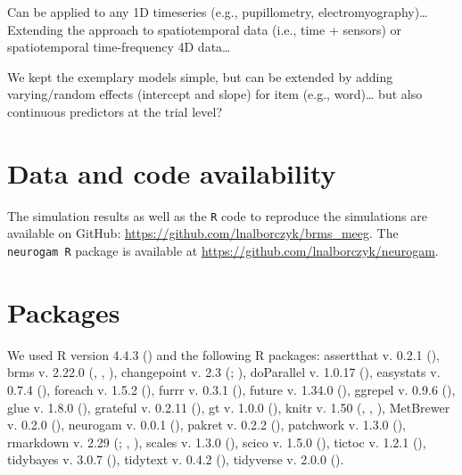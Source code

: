 \documentclass[
  doc,
  floatsintext,
  longtable,
  a4paper,
  nolmodern,
  notxfonts,
  notimes,
  donotrepeattitle,
  colorlinks=true,linkcolor=blue,citecolor=blue,urlcolor=blue]{apa7}
\begin{document}
Can be applied to any 1D timeseries (e.g., pupillometry,
electromyography)\ldots{} Extending the approach to spatiotemporal data
(i.e., time + sensors) or spatiotemporal time-frequency 4D data\ldots{}

We kept the exemplary models simple, but can be extended by adding
varying/random effects (intercept and slope) for item (e.g.,
word)\ldots{} but also continuous predictors at the trial level?

\newpage

\section{Data and code availability}\label{data-and-code-availability}

The simulation results as well as the \texttt{R} code to reproduce the
simulations are available on GitHub:
\url{https://github.com/lnalborczyk/brms_meeg}. The \texttt{neurogam\ R}
package is available at \url{https://github.com/lnalborczyk/neurogam}.

\section{Packages}\label{packages}

We used R version 4.4.3 () and the
following R packages: assertthat v. 0.2.1
(), brms v. 2.22.0
(, ,
), changepoint v. 2.3
(;
), doParallel v.
1.0.17 (),
easystats v. 0.7.4 (),
foreach v. 1.5.2 (),
furrr v. 0.3.1 (), future
v. 1.34.0 (), ggrepel v.
0.9.6 (), glue v. 1.8.0
(), grateful v. 0.2.11
(), gt v.
1.0.0 (), knitr v. 1.50
(, ,
), MetBrewer v. 0.2.0
(), neurogam v. 0.0.1
(), pakret v. 0.2.2
(), patchwork v. 1.3.0
(), rmarkdown v. 2.29
(;
,
), scales v. 1.3.0
(), scico v. 1.5.0
(), tictoc v. 1.2.1
(), tidybayes v. 3.0.7
(), tidytext v. 0.4.2
(), tidyverse v. 2.0.0
().
\end{document}
